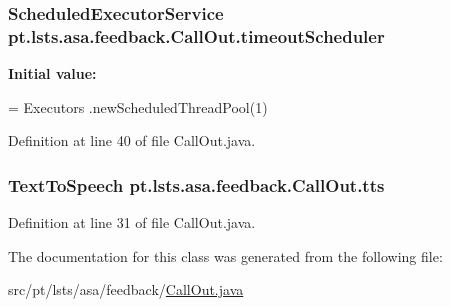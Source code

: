 \subsubsection[{timeout\+Scheduler}]{\setlength{\rightskip}{0pt plus 5cm}Scheduled\+Executor\+Service pt.\+lsts.\+asa.\+feedback.\+Call\+Out.\+timeout\+Scheduler\hspace{0.3cm}{\ttfamily [private]}}\label{classpt_1_1lsts_1_1asa_1_1feedback_1_1CallOut_ab9d2ddff0dddef8a356da30528da4f1e}
{\bfseries Initial value\+:}
\begin{DoxyCode}
= Executors
            .newScheduledThreadPool(1)
\end{DoxyCode}


Definition at line 40 of file Call\+Out.\+java.

\hypertarget{classpt_1_1lsts_1_1asa_1_1feedback_1_1CallOut_ada6aee96c4012231f3083fdc30557503}{}
\subsubsection[{tts}]{\setlength{\rightskip}{0pt plus 5cm}Text\+To\+Speech pt.\+lsts.\+asa.\+feedback.\+Call\+Out.\+tts\hspace{0.3cm}{\ttfamily [private]}}\label{classpt_1_1lsts_1_1asa_1_1feedback_1_1CallOut_ada6aee96c4012231f3083fdc30557503}


Definition at line 31 of file Call\+Out.\+java.



The documentation for this class was generated from the following file\+:\begin{DoxyCompactItemize}
\item 
src/pt/lsts/asa/feedback/\hyperlink{CallOut_8java}{Call\+Out.\+java}\end{DoxyCompactItemize}
